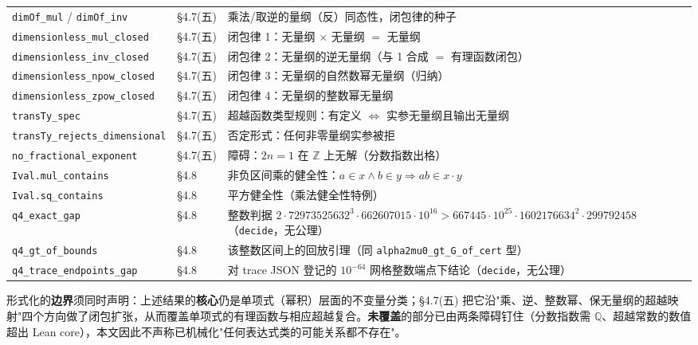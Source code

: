 \documentclass[12pt,a4paper]{article}
\begin{document}
\begin{center}
\begin{tabular}{@{}llp{7.6cm}@{}}
\texttt{dimOf\_\allowbreak{}mul} / \texttt{dimOf\_\allowbreak{}inv} & §4.7(五) & 乘法/取逆的量纲（反）同态性，闭包律的种子 \\
\texttt{dimensionless\_\allowbreak{}mul\_\allowbreak{}closed} & §4.7(五) & 闭包律 1：无量纲 $\times$ 无量纲 $=$ 无量纲 \\
\texttt{dimensionless\_\allowbreak{}inv\_\allowbreak{}closed} & §4.7(五) & 闭包律 2：无量纲的逆无量纲（与 1 合成 $=$ 有理函数闭包） \\
\texttt{dimensionless\_\allowbreak{}npow\_\allowbreak{}closed} & §4.7(五) & 闭包律 3：无量纲的自然数幂无量纲（归纳） \\
\texttt{dimensionless\_\allowbreak{}zpow\_\allowbreak{}closed} & §4.7(五) & 闭包律 4：无量纲的整数幂无量纲 \\
\texttt{transTy\_\allowbreak{}spec} & §4.7(五) & 超越函数类型规则：有定义 $\iff$ 实参无量纲且输出无量纲 \\
\texttt{transTy\_\allowbreak{}rejects\_\allowbreak{}dimensional} & §4.7(五) & 否定形式：任何非零量纲实参被拒 \\
\texttt{no\_\allowbreak{}fractional\_\allowbreak{}exponent} & §4.7(五) & 障碍：$2n=1$ 在 $\mathbb{Z}$ 上无解（分数指数出格） \\
\texttt{Ival.mul\_\allowbreak{}contains} & §4.8 & 非负区间乘的健全性：$a\in x\wedge b\in y\Rightarrow ab\in x\!\cdot\!y$ \\
\texttt{Ival.sq\_\allowbreak{}contains} & §4.8 & 平方健全性（乘法健全性特例） \\
\texttt{q4\_\allowbreak{}exact\_\allowbreak{}gap} & §4.8 & 整数判据 $2\cdot72973525632^3\!\cdot\!662607015\!\cdot\!10^{16}>667445\!\cdot\!10^{25}\!\cdot\!1602176634^2\!\cdot\!299792458$（\texttt{decide}，无公理） \\
\texttt{q4\_\allowbreak{}gt\_\allowbreak{}of\_\allowbreak{}bounds} & §4.8 & 该整数区间上的回放引理（同 \texttt{alpha2mu0\_\allowbreak{}gt\_\allowbreak{}G\_\allowbreak{}of\_\allowbreak{}cert} 型） \\
\texttt{q4\_\allowbreak{}trace\_\allowbreak{}endpoints\_\allowbreak{}gap} & §4.8 & 对 trace JSON 登记的 $10^{-64}$ 网格整数端点下结论（\texttt{decide}，无公理） \\
\bottomrule
\end{tabular}
\end{center}

\noindent 形式化的\textbf{边界}须同时声明：上述结果的\textbf{核心}仍是单项式（幂积）层面的不变量分类；§4.7(五) 把它沿"乘、逆、整数幂、保无量纲的超越映射"四个方向做了闭包扩张，从而覆盖单项式的有理函数与相应超越复合。\textbf{未覆盖}的部分已由两条障碍钉住（分数指数需 $\mathbb{Q}$、超越常数的数值超出 Lean core），本文因此不声称已机械化"任何表达式类的可能关系都不存在"。
\end{document}
